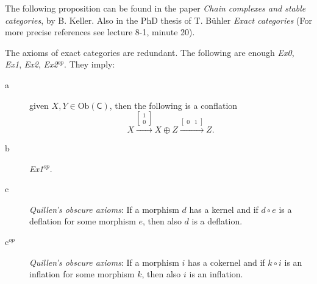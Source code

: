 The following proposition can be found in the paper {\em Chain complexes and stable categories}, by B. Keller.
Also in the PhD thesis of  T. Bühler {\em Exact categories}
(For more precise references see lecture 8-1, minute 20).
\begin{prop}[Keller]
	The axioms of exact categories are redundant.
	The following are enough {\em Ex0}, {\em Ex1}, {\em Ex2}, {\em Ex2}$^{op}$.
	They imply:
	\begin{description}
		\item[a] given $X, Y \in \mathrm{Ob} \left(\mathsf{C}\right)$, then the following is a conflation
			\begin{equation}
			X \xrightarrow{
				\begin{bmatrix}
					1 \\ 0
				\end{bmatrix} 
			} X \oplus Z
			\xrightarrow{
				\begin{bmatrix}
					0 & 1
				\end{bmatrix} 
			} Z
			.\end{equation} 
		\item[b] {\em Ex1}$^{op}$.
		\item[c] {\em Quillen's obscure axioms}: If a morphism $d$ has a kernel and if $d \circ e$ is a deflation for some morphism $e$, then also $d$ is a deflation.
		\item[c$^{op}$] {\em Quillen's obscure axioms}: If a morphism $i$ has a cokernel and if $k \circ i$ is an inflation for some morphism $k$, then also $i$ is an inflation.
	\end{description} 
\end{prop} 
